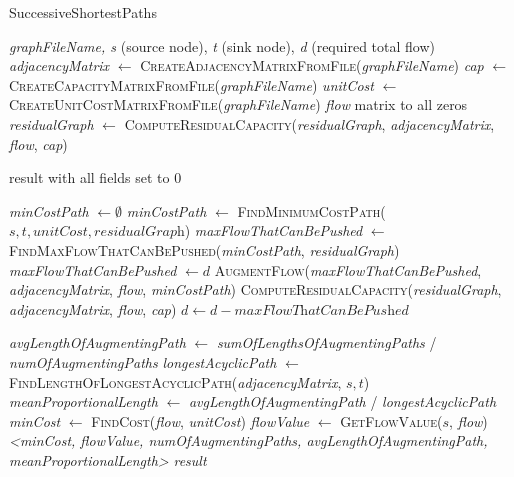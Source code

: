 \documentclass{article}
\begin{document}
\begin{algorithm}[H]
\caption{\textcolor{keywordcolor}{SuccessiveShortestPaths}}
\begin{algorithmic}[1]
\State {} \textit{graphFileName, s} (source node), \textit{t} (sink node), \textit{d} (required total flow)
\State \textit{adjacencyMatrix} $\gets$ \textcolor{identifiercolor}{\textsc{CreateAdjacencyMatrixFromFile}}(\textit{graphFileName})
\State \textit{cap} $\gets$ \textcolor{identifiercolor}{\textsc{CreateCapacityMatrixFromFile}}(\textit{graphFileName})
\State \textit{unitCost} $\gets$ \textcolor{identifiercolor}{\textsc{CreateUnitCostMatrixFromFile}}(\textit{graphFileName})
\State {} \textit{flow} matrix to all zeros
\State \textit{residualGraph} $\gets$ \textcolor{identifiercolor}{\textsc{ComputeResidualCapacity}}(\textit{residualGraph}, \textit{adjacencyMatrix}, \textit{flow}, \textit{cap})

    \State \Return result with all fields set to 0
\EndIf

    \State {} \textit{minCostPath} $\gets \emptyset$
    \State \textit{minCostPath} $\gets$ \textcolor{identifiercolor}{\textsc{FindMinimumCostPath}}($s, t, \textit{unitCost}, \textit{residualGraph}$)
    \State \textit{maxFlowThatCanBePushed} $\gets$ \textcolor{identifiercolor}{\textsc{FindMaxFlowThatCanBePushed}}(\textit{minCostPath}, \textit{residualGraph})
        \State \textit{maxFlowThatCanBePushed} $\gets d$
    \EndIf
    \State \textcolor{identifiercolor}{\textsc{AugmentFlow}}(\textit{maxFlowThatCanBePushed}, \textit{adjacencyMatrix}, \textit{flow}, \textit{minCostPath})
    \State \textcolor{identifiercolor}{\textsc{ComputeResidualCapacity}}(\textit{residualGraph}, \textit{adjacencyMatrix}, \textit{flow}, \textit{cap})
    \State $d \gets d - \textit{maxFlowThatCanBePushed}$
\EndWhile

\State \textit{avgLengthOfAugmentingPath} $\gets$ \textit{sumOfLengthsOfAugmentingPaths} / \textit{numOfAugmentingPaths}
\State \textit{longestAcyclicPath} $\gets$ \textcolor{identifiercolor}{\textsc{FindLengthOfLongestAcyclicPath}}(\textit{adjacencyMatrix}, $s, t$)
\State \textit{meanProportionalLength} $\gets$ \textit{avgLengthOfAugmentingPath} / \textit{longestAcyclicPath}
\State \textit{minCost} $\gets$ \textcolor{identifiercolor}{\textsc{FindCost}}(\textit{flow}, \textit{unitCost})
\State \textit{flowValue} $\gets$ \textcolor{identifiercolor}{\textsc{GetFlowValue}}($s$, \textit{flow})
\State {} \textit{<minCost, flowValue, numOfAugmentingPaths, avgLengthOfAugmentingPath, meanProportionalLength>}
\State \Return \textit{result}
\end{algorithmic}
\end{algorithm}
\end{document}
